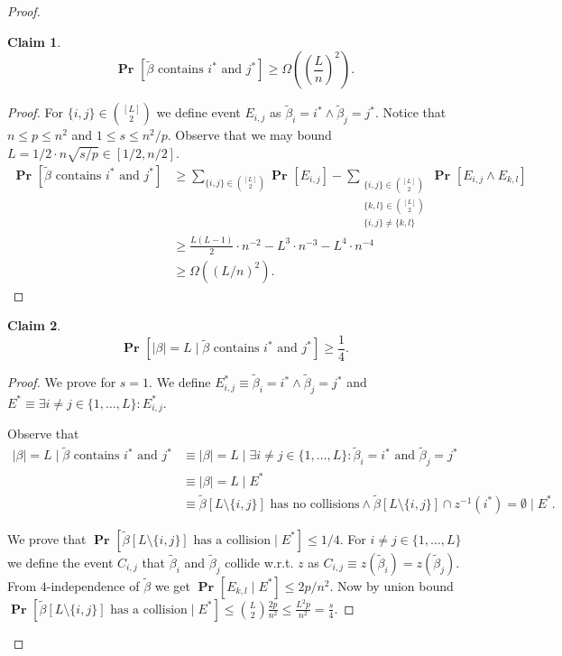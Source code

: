 \documentclass{article}
\newcommand{\probs}[2]{\operatorname{\mathbf{Pr}}_{{#1}}\left[{#2}\right]}
\newcommand{\prob}[1]{\probs{}{#1}}
\newtheorem{claim}{Claim}
\begin{document}
\begin{proof}
\begin{claim}
\[ \prob{\tilde \beta\mbox{ contains }i^{*}\mbox{ and }j^{*}} \geq \Omega\left(\left(\frac{L}{n}\right)^2\right). \]
\end{claim}
\begin{proof}
For $\{i, j\} \in \binom{[L]}{2}$ we define event $E_{i, j}$ as $\tilde \beta_i = i^* \wedge \tilde \beta_j = j^*$.
Notice that $n \leq p \leq n^2$ and $1 \leq s \leq n^2/p$.
Observe that we may bound $L = 1/2 \cdot n\sqrt{s/p} \in [1/2, n/2]$.
\begin{align*}
    \prob{\tilde \beta\mbox{ contains }i^{*}\mbox{ and }j^{*}} 
        & \geq \sum_{\{i, j\} \in \binom{[L]}{2}} \prob{E_{i, j}} - \sum_{\substack{\{i, j\} \in \binom{[L]}{2} \\ \{k, l\} \in \binom{[L]}{2} \\ \{i, j\} \neq \{k, l\}}} \prob{E_{i, j} \wedge E_{k, l}} \\
        & \geq \frac{L(L-1)}{2} \cdot n^{-2} - L^3 \cdot n^{-3} - L^4 \cdot n^{-4} \\
        & \geq \Omega\left((L/n)^2\right).
\end{align*}
\end{proof}

\begin{claim}
\[ \prob{|\beta| = L \mid \tilde \beta\mbox{ contains }i^{*}\mbox{ and }j^{*}} \geq \frac{1}{4}. \]
\end{claim}
\begin{proof}
We prove for $s = 1$. We define $E^{*}_{i, j} \equiv \tilde \beta_i = i^{*} \wedge \tilde \beta_j = j^{*}$ and $E^{*} \equiv \exists i \neq j \in \{1, \dots, L\} \colon E^{*}_{i, j}$.

Observe that
\begin{align*}
|\beta| = L \mid \tilde \beta\mbox{ contains }i^{*}\mbox{ and }j^{*} 
    & \equiv |\beta| = L \mid \exists i \neq j \in \{1, \dots, L\} \colon \tilde \beta_i = i^{*}\mbox{ and } \tilde \beta_j = j^{*} \\
    & \equiv |\beta| = L \mid E^{*} \\
    & \equiv \tilde \beta[L \setminus \{i, j\}] \mbox{ has no collisions} \wedge \tilde \beta[L \setminus \{i, j\}] \cap z^{-1}(i^{*}) = \emptyset \mid E^{*}.
\end{align*}

We prove that $\prob{\tilde \beta[L \setminus \{i, j\}] \mbox{ has a collision} \mid E^{*}} \leq 1/4.$
For $i \neq j \in \{1, \dots, L\}$ we define the event $C_{i, j}$ that $\tilde \beta_i$ and $\tilde \beta_j$ collide w.r.t. $z$ as $C_{i, j} \equiv z(\tilde \beta_i) = z(\tilde \beta_j)$.
From $4$-independence of $\tilde \beta$ we get $\prob{E_{k, l} \mid E^{*}} \leq 2p/n^2$.
Now by union bound $\prob{\tilde \beta[L \setminus \{i, j\}] \mbox{ has a collision} \mid E^{*}} \leq \binom{L}{2}\frac{2p}{n^2} \leq \frac{L^2p}{n^2} = \frac{s}{4}$.


\end{proof}
\end{proof}
\end{document}
